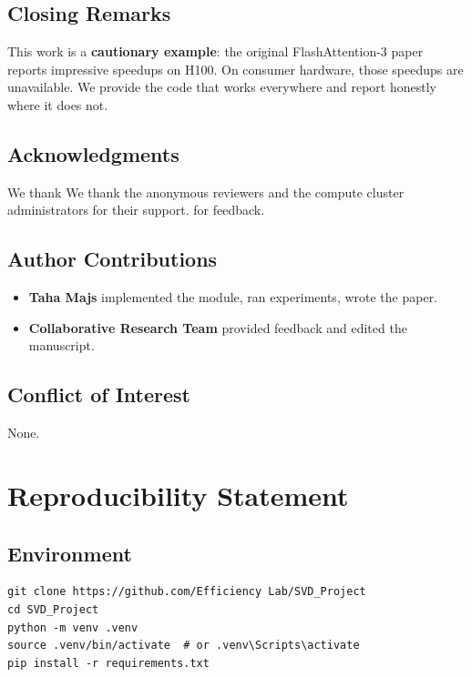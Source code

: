 \subsection{Closing Remarks}

This work is a \textbf{cautionary example}: the original FlashAttention-3 paper 
reports impressive speedups on H100. On consumer hardware, those speedups 
are unavailable. We provide the code that works everywhere and report 
honestly where it does not.

\subsection{Acknowledgments}

We thank We thank the anonymous reviewers and the compute cluster administrators for their support. for feedback.

\subsection{Author Contributions}

\begin{itemize}
\item \textbf{Taha Majs} implemented the module, ran experiments, wrote the paper.
\item \textbf{Collaborative Research Team} provided feedback and edited the manuscript.

\end{itemize}
\subsection{Conflict of Interest}

None.




\section{Reproducibility Statement}

\subsection{Environment}

\begin{lstlisting}
git clone https://github.com/Efficiency Lab/SVD_Project
cd SVD_Project
python -m venv .venv
source .venv/bin/activate  # or .venv\Scripts\activate
pip install -r requirements.txt
\end{lstlisting}

